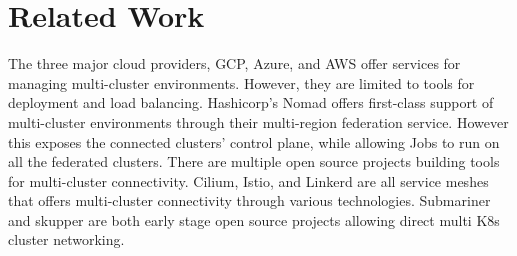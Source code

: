 
\chapter{Related Work}

%
%
%
%
%
%
%
%
%
%
%
%
The three major cloud providers, GCP, Azure, and AWS offer services for
managing multi-cluster environments. However, they are limited to tools for
deployment and load balancing.   
Hashicorp's Nomad offers first-class support of multi-cluster environments
through their multi-region federation service. However this exposes the
connected clusters' control plane, while allowing Jobs to run on all the
federated clusters. 
There are multiple open source projects building tools for multi-cluster
 connectivity. Cilium, Istio, and Linkerd are all service meshes that offers multi-cluster connectivity through various technologies.
Submariner and skupper are both early stage open source projects allowing direct multi K8s cluster networking. 

